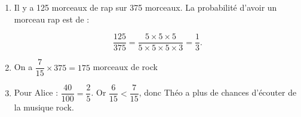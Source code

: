 
\medskip

\begin{enumerate}
\item Il y a 125 morceaux de rap sur 375 morceaux. La probabilité d'avoir un morceau rap est de :

\[\dfrac{125}{375} = \dfrac{ 5 \times 5 \times 5 }{5 \times 5 \times 5 \times 3} = \dfrac{1}{3}.\]
\item On a $\dfrac{7}{15} \times 375 = 175$ morceaux de rock
\item  Pour Alice :  $\dfrac{40}{100} = \dfrac{2}{5}$. Or $\dfrac{6}{15} < \dfrac{7}{15}$,
donc Théo a plus de chances d'écouter de la musique rock.
\end{enumerate}

\bigskip

